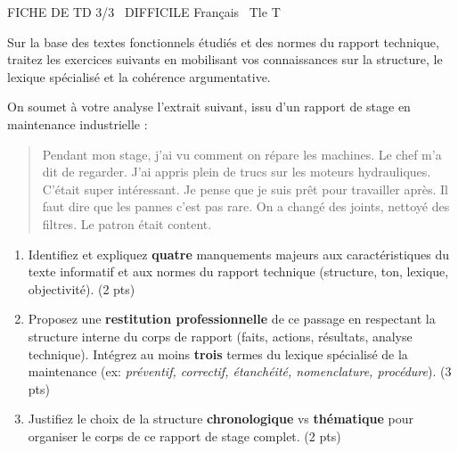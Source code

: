 \documentclass[11pt]{article}
\begin{document}
\begin{tcolorbox}[enhanced,colback=popink,colframe=popink,arc=10pt,boxrule=0pt,left=12pt,right=12pt,top=9pt,bottom=9pt]
{\color{white}\popxbold\small FICHE DE TD 3/3 \textbullet\ DIFFICILE \hfill Français \textbullet\ Tle T\par}
\end{tcolorbox}
\vspace{4pt}
\noindent Sur la base des textes fonctionnels étudiés et des normes du rapport technique, traitez les exercices suivants en mobilisant vos connaissances sur la structure, le lexique spécialisé et la cohérence argumentative.

\begin{exercice}
On soumet à votre analyse l'extrait suivant, issu d'un rapport de stage en maintenance industrielle : 

\begin{quote}
\og{}Pendant mon stage, j'ai vu comment on répare les machines. Le chef m'a dit de regarder. J'ai appris plein de trucs sur les moteurs hydrauliques. C'était super intéressant. Je pense que je suis prêt pour travailler après. Il faut dire que les pannes c'est pas rare. On a changé des joints, nettoyé des filtres. Le patron était content.\fg{}
\end{quote}

\begin{enumerate}
    \item Identifiez et expliquez \textbf{quatre} manquements majeurs aux caractéristiques du texte informatif et aux normes du rapport technique (structure, ton, lexique, objectivité). (2 pts)
    \item Proposez une \textbf{restitution professionnelle} de ce passage en respectant la structure interne du corps de rapport (faits, actions, résultats, analyse technique). Intégrez au moins \textbf{trois} termes du lexique spécialisé de la maintenance (ex: \textit{préventif, correctif, étanchéité, nomenclature, procédure}). (3 pts)
    \item Justifiez le choix de la structure \textbf{chronologique} vs \textbf{thématique} pour organiser le corps de ce rapport de stage complet. (2 pts)
\end{enumerate}
\end{exercice}
\end{document}
